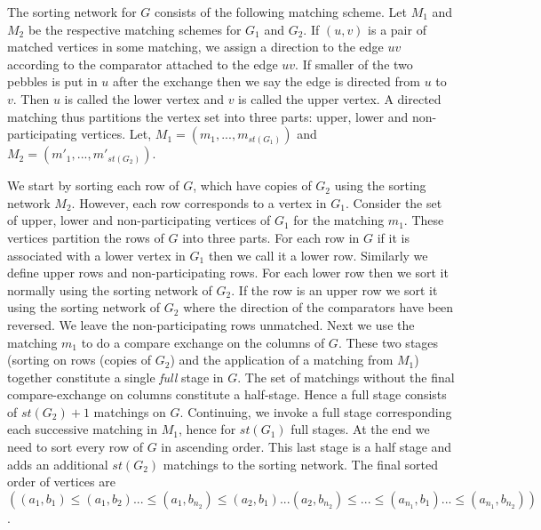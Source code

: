 \documentclass[runningheads,a4paper]{llncs}
\begin{document}
The sorting network for $G$ consists of the following matching scheme. Let 
$M_1$ and $M_2$ be the respective matching schemes for $G_1$ and $G_2$. If $(u,v)$ is a pair of matched vertices in some matching, we assign a direction to the edge $uv$  according to the comparator attached to the edge $uv$. If smaller of the two pebbles is put in $u$ after the exchange then we say the edge is directed from $u$ to $v$. Then $u$ is called the lower vertex and $v$ is called the upper vertex. A directed matching thus partitions the vertex set into three parts: upper, lower and non-participating vertices. Let, $M_1 = (m_{1},...,m_{{st(G_1)}})$ and $M_2 =  (m'_{1},...,m'_{{st(G_2)}})$.

We start by sorting each row of $G$, which have copies of $G_2$ using the sorting network $M_2$. However, each row corresponds to a vertex in $G_1$.  Consider the set of upper, lower and non-participating vertices of $G_1$ for the matching $m_1$. These vertices partition the rows of $G$ into three parts. For each row in $G$ if it is associated with a lower vertex in $G_1$ then we call it a lower row. Similarly we define upper rows and non-participating rows. For each lower row then we sort it normally using the sorting network of $G_2$. If the row is an upper row we sort it using the sorting network of $G_2$ where the direction of the comparators have been reversed. We leave the non-participating rows unmatched. Next we use the matching $m_1$ to do a compare exchange on the columns of $G$. These two stages (sorting on rows (copies of $G_2$) and the application of a matching from $M_1$) together constitute a single \textit{full} stage in $G$. The set of matchings without the final compare-exchange on columns constitute a half-stage. Hence a full stage consists of $st(G_2) + 1$ matchings on $G$. Continuing, we invoke a full stage corresponding each successive matching in $M_1$, hence for $st(G_1)$ full stages. At the end we need to sort every row of $G$ in ascending order.  This last stage is a half stage and adds an additional $st(G_2)$ matchings  to the sorting network. The final sorted order of vertices are $((a_1,b_1) \le (a_1,b_2) ... \le (a_1,b_{n_2}) \le (a_2,b_1) ... (a_2,b_{n_2})\le...\le(a_{n_1},b_1)...\le (a_{n_1},b_{n_2}))$.
\end{document}
